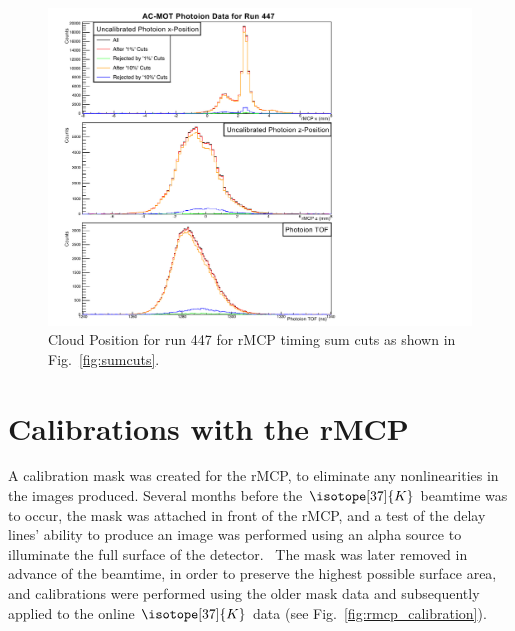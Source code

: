 \begin{figure}[h!tb]
	\centering
	\includegraphics[width=.999\linewidth]
	{Figures/rMCP_xyz_comparecuts447.pdf}
	\caption[Cloud Position for run 447 for various rMCP timing sum cuts]{Cloud Position for run 447 for rMCP timing sum cuts as shown in Fig.~\ref{fig:sumcuts}.}	
	\label{fig:position_with_sumcuts}
\end{figure}


\FloatBarrier  %
\section{Calibrations with the rMCP}
\label{sec:rmcp_cals}
A calibration mask was created for the rMCP, to eliminate any nonlinearities in the images produced.  Several months before the $\isotope[37]{K}$ beamtime was to occur, the mask was attached in front of the rMCP, and a test of the delay lines' ability to produce an image was performed using an alpha source to illuminate the full surface of the detector.~  The mask was later removed in advance of the beamtime, in order to preserve the highest possible surface area, and calibrations were performed using the older mask data and subsequently applied to the online $\isotope[37]{K}$ data (see Fig.~\ref{fig:rmcp_calibration}).

